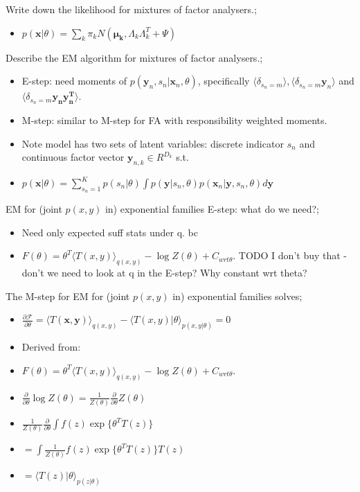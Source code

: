 \documentclass{article}
\begin{document}
Write down the likelihood for mixtures of factor analysers.; \begin{itemize} \item $p(\mathbf{x}|\theta) = \sum_k \pi_k N(\mathbf{\mu_k}, \Lambda_k\Lambda_k^T + \Psi)$ \end{itemize}

Describe the EM algorithm for mixtures of factor analysers.; \begin{itemize} \item E-step: need moments of $p(\mathbf{y}_n, s_n | \mathbf{x}_n, \theta)$, specifically $\langle \delta_{s_n=m}\rangle, \langle\delta_{s_n=m}\mathbf{y}_n\rangle$ and $\langle \delta_{s_n=m}\mathbf{y_ny_n^T}\rangle$.  \item M-step: similar to M-step for FA with responsibility weighted moments. \item Note model has two sets of latent variables: discrete indicator $s_n$ and continuous factor vector $\mathbf{y}_{n,k} \in R^{D_k}$ s.t. \item $p(\mathbf{x}|\theta) = \sum_{s_n=1}^K p(s_n|\theta) \int p(\mathbf{y}|s_n, \theta)p(\mathbf{x}_n|\mathbf{y}, s_n, \theta)d\mathbf{y}$ \end{itemize} 

EM for (joint $p(x,y)$ in) exponential families E-step: what do we need?; \begin{itemize} \item Need only expected suff stats under q. bc \item $F(\theta) = \theta^T\langle T(x, y) \rangle_{q(x, y)} - \log Z(\theta) + C_{wrt \theta}$. TODO I don't buy that - don't we need to look at q in the E-step? Why constant wrt theta?\end{itemize}

The M-step for EM for (joint $p(x,y)$ in) exponential families solves; \begin{itemize} \item $\frac{\partial \mathcal{F}}{\partial \theta}= \langle T(\mathbf{x, y})\rangle_{q(x, y)} - \langle T(x, y)|\theta \rangle_{p(x, y|\theta)} = 0$ \item Derived from: \item $F(\theta) = \theta^T\langle T(x, y) \rangle_{q(x, y)} - \log Z(\theta) + C_{wrt \theta}$. \item $\frac{\partial}{\partial \theta}\log Z(\theta) = \frac{1}{Z(\theta)}\frac{\partial}{\partial\theta}Z(\theta)$ \item $\frac{1}{Z(\theta)}\frac{\partial}{\partial\theta}\int f(z)\exp\{\theta^TT(z)\}$ \item $=\int \frac{1}{Z(\theta)}f(z)\exp\{\theta^TT(z)\}T(z)$ \item $=\langle T(z)|\theta\rangle_{p(z|\theta)}$ \end{itemize}
\end{document}
